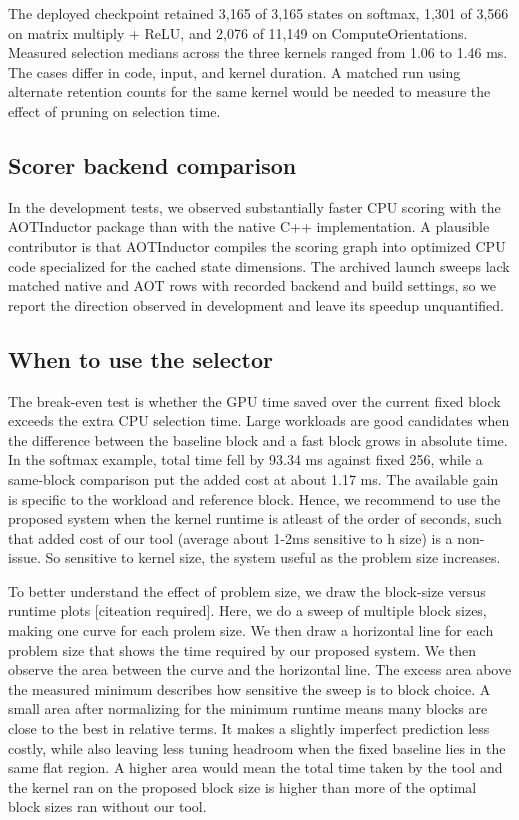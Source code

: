 \documentclass[11pt,letterpaper]{article}
\begin{document}
The deployed checkpoint retained 3,165 of 3,165 states on softmax, 1,301 of 3,566 on matrix multiply + ReLU,
and 2,076 of 11,149 on ComputeOrientations. Measured selection medians across the three kernels ranged from
1.06 to 1.46 ms. The cases differ in code, input, and kernel duration. A matched run using alternate
retention counts for the same kernel would be needed to measure the effect of pruning on selection time.

\subsection{Scorer backend comparison}

In the development tests, we observed substantially faster CPU scoring with the AOTInductor package
than with the native C++ implementation. A plausible contributor is that AOTInductor compiles the scoring
graph into optimized CPU code specialized for the cached state dimensions. The archived launch sweeps lack
matched native and AOT rows with recorded backend and build settings, so we report the direction observed in
development and leave its speedup unquantified.


\subsection{When to use the selector}

The break-even test is whether the GPU time saved over the current fixed block exceeds the extra CPU
selection time. Large workloads are good candidates when the difference between the baseline block and a
fast block grows in absolute time. In the softmax example, total time fell by 93.34 ms against fixed 256,
while a same-block comparison put the added cost at about 1.17 ms. The available gain is specific to the
workload and reference block. Hence, we recommend to use the proposed system when the kernel runtime is atleast of the order of seconds, such that 
added cost of our tool (average about 1-2ms sensitive to h size) is a non-issue. So sensitive to kernel size, the system useful 
as the problem size increases.

To better understand the effect of problem size, we draw the block-size versus runtime plots [citeation required]. Here, we do a sweep of multiple 
block sizes, making one curve for each prolem size. We then draw a horizontal line for each problem size that shows the time required by our
proposed system. We then observe the area between the curve and the horizontal line. The excess area above the measured minimum describes how sensitive
the sweep is to block choice. A small area after normalizing for the minimum runtime means many blocks are
close to the best in relative terms. It makes a slightly imperfect prediction less costly, while also
leaving less tuning headroom when the fixed baseline lies in the same flat region. A higher area would mean the total time taken by the tool and the kernel
ran on the proposed block size is higher than more of the optimal block sizes ran without our tool.
\end{document}
